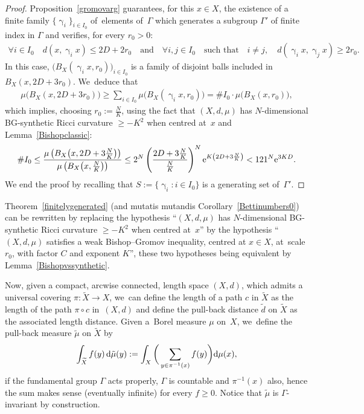 \documentclass[10pt,a4paper]{amsart}
\numberwithin{equation}{section}
\newcommand{\f}{\rightarrow}
\newcommand{\g}{\operatorname{\gamma}}
\begin{document}
\begin{proof} Proposition~\ref{gromovarg} guarantees, for this $x \in X$,
the existence of a finite family
$\{\g_i\}_{i \in I_0}$ of~elements of~$\Gamma$ which generates a subgroup
$\Gamma'$ of finite index in $\Gamma$ and verifies, for every $r_0 > 0$:
\begin{gather*}
\forall i \in I_0\quad d(x, \g_i x) \le 2 D + 2 r_0 \quad \text{and} \quad \forall i, j \in I_0 \quad\text{such that}\quad i\ne j,\quad d(\g_i x, \g_j x) \ge 2 r_0.
\end{gather*}
In this case, $\big(B_X ( \g_i x, r_0)\big)_{i \in I_0}$ is a family of disjoint balls included in $B_X (x, 2 D + 3 r_0)$. We~deduce that
\begin{gather*}
\mu \big( B_X (x, 2 D + 3 r_0)\big) \ge \sum_{i \in I_0} \mu \big(B_X ( \g_i x, r_0)\big) = \# I_0 \cdot \mu \big(B_X ( x, r_0)\big),
\end{gather*}
which implies, choosing $r_0 := \frac{N}{K}$, using the fact that $(X,d,\mu)$ has $N$-dimensional BG-synthetic Ricci curvature $\ge -K^2$
when centred at~$x$ and Lemma~\ref{Bishopclassic}:
\begin{gather*}
\# I_0 \le \dfrac{\mu \left(B_X \big(x, 2 D + 3 \frac{N}{K}\big)\right)}{\mu \left(B_X \big(x, \frac{N}{K}\big)\right)} \le 2^N
\left(\dfrac{2 D + 3 \frac{N}{K}}{\frac{N}{K}}\right)^{N} {\rm e}^{K \left(2 D + 3 \frac{N}{K}\right)} < 121^N {\rm e}^{3 K D}.
\end{gather*}
We end the proof by recalling that $S := \{\g_i \colon i \in I_0\}$ is a generating set of~$\Gamma'$.
\end{proof}

Theorem~\ref{finitelygenerated} (and mutatis mutandis Corollary~\ref{Bettinumbers0}) can be rewritten by replacing the hypothesis
``$(X,d,\mu)$ has $N$-dimensional BG-synthetic Ricci curvature $\ge
-K^2$ when centred at~$x$'' by the hypothesis ``$(X,d,\mu)$ satisfies a weak
Bishop--Gromov inequality, centred at $x\in X$, at~scale $r_0$, with factor $C$ and exponent $K$'', these two hypotheses being equivalent by Lemma~\ref{Bishopvssynthetic}.

\medskip

Now, given a compact, arcwise connected, length space $(X, d)$, which admits a universal covering $\pi\colon \widetilde X \f X$, we~can define the length of a path $c$ in $\widetilde X$ as the length of
the path $\pi \circ c$ in~$(X,d)$ and define the pull-back distance $\tilde d$ on
$\widetilde X$ as the associated length distance. Given a~Borel measure $\mu$ on~$X$, we~define the pull-back measure $\tilde \mu$ on $\widetilde X$ by
\begin{gather*}
\int_{\widetilde X} f (y)\, {\rm d} \tilde \mu (y) := \int_{X} \bigg(\sum_{y \in \pi^{-1}(x)} f (y) \bigg) {\rm d} \mu (x),
\end{gather*}
if the fundamental group $\Gamma$ acts properly, $\Gamma$ is countable and $\pi^{-1}(x)$ also, hence the sum makes sense (eventually infinite)
for every $f\ge 0$. Notice that $\tilde \mu$ is $\Gamma$-invariant by construction.
\end{document}
